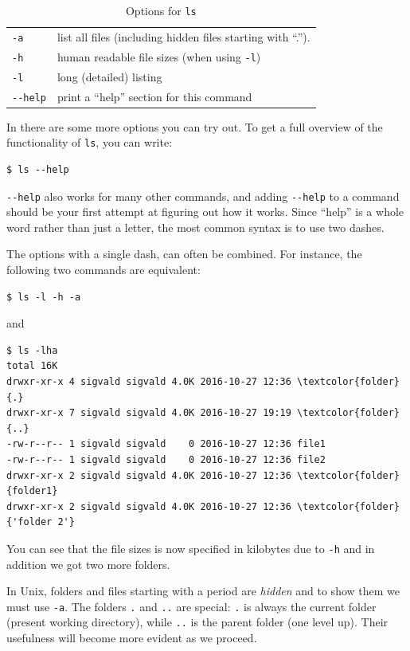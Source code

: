 \begin{table}
	\centering
	\caption{Options for \texttt{ls}}
	\begin{tabular}{ll}
	\hline
	\verb|-a|		&	list all files (including hidden files starting with ``.'').	\\
	\verb|-h|		&	human readable file sizes (when using \verb|-l|)				\\
	\verb|-l|		&	long (detailed) listing										\\
	\verb|--help|	&	print a ``help'' section for this command
	\end{tabular}
	\label{tab:bash:ls}
\end{table}

In  there are some more options you can try out. To get a full overview of the functionality of \verb|ls|, you can write:

\begin{verbatim}
$ ls --help
\end{verbatim}

\verb|--help| also works for many other commands, and adding \verb|--help| to a command should be your first attempt at figuring out how it works. Since ``help'' is a whole word rather than just a letter, the most common syntax is to use two dashes.

The options with a single dash, can often be combined. For instance, the following two commands are equivalent:

\begin{verbatim}
$ ls -l -h -a
\end{verbatim}
and

\begin{Verbatim}[commandchars=\\\{\}]
$ ls -lha
total 16K
drwxr-xr-x 4 sigvald sigvald 4.0K 2016-10-27 12:36 \textcolor{folder}{.}
drwxr-xr-x 7 sigvald sigvald 4.0K 2016-10-27 19:19 \textcolor{folder}{..}
-rw-r--r-- 1 sigvald sigvald    0 2016-10-27 12:36 file1
-rw-r--r-- 1 sigvald sigvald    0 2016-10-27 12:36 file2
drwxr-xr-x 2 sigvald sigvald 4.0K 2016-10-27 12:36 \textcolor{folder}{folder1}
drwxr-xr-x 2 sigvald sigvald 4.0K 2016-10-27 12:36 \textcolor{folder}{'folder 2'}
\end{Verbatim}
\ignore{$}
You can see that the file sizes is now specified in kilobytes due to \verb|-h| and in addition we got two more folders.

In Unix, folders and files starting with a period are \emph{hidden} and to show them we must use \verb|-a|. The folders \verb|.| and \verb|..| are special: \verb|.| is always the current folder (present working directory), while \verb|..| is the parent folder (one level up). Their usefulness will become more evident as we proceed.

